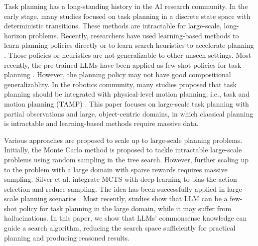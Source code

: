 Task planning has a long-standing history in the AI research community. In the early stage, many studies \cite{aeronautiques1998pddl, hoffmann2001ff, helmert2006fast, garrett2020pddlstream} focused on task planning in a discrete state space with deterministic transitions. These methods are intractable for large-scale, long-horizon problems. Recently, researchers have used learning-based methods to learn planning policies directly \cite{li2022pre} or to learn search heuristics to accelerate planning \cite{silver2017mastering, silver2018general, xu2019regression, cai2019lets, sharma-etal-2022-skill}. Those policies or heuristics are not generalizable to other unseen settings. Most recently, the pre-trained LLMs have been applied as few-shot policies for task planning \cite{huang2022language, ahn2022can, huang2022inner}. However, the planning policy may not have good compositional generalizablity. In the robotics community, many studies proposed that task planning should be integrated with physical-level motion planning, i.e., task and motion planning (TAMP) \cite{garrett2021integrated, garrett2020pddlstream, ding2023task}. This paper focuses on large-scale task planning with partial observations and large, object-centric domains, in which classical planning is intractable and learning-based methods require massive data.  

Various approaches are proposed to scale up to large-scale planning problems. Initially, the Monte Carlo method \cite{kocsis2006bandit, coulom2007efficient, browne2012survey} is proposed to tackle intractable large-scale problems using random sampling in the tree search. However, further scaling up to the problem with a large domain with sparse rewards requires massive sampling. Silver et al. \cite{silver2017mastering, silver2018general} integrate MCTS with deep learning to bias the action selection and reduce sampling. The idea has been successfully applied in large-scale planning scenarios \cite{silver2017mastering, silver2018general, cai2019lets, schrittwieser2020mastering}. Most recently, studies show that LLM can be a few-shot policy for task planning \cite{huang2022language, ahn2022can, huang2022inner} in the large domain, while it may suffer from hallucinations. In this paper, we show that LLMs' commonsense knowledge can guide a search algorithm, reducing the search space sufficiently for practical planning and producing reasoned results.

